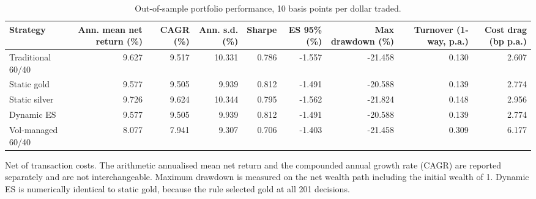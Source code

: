 \begin{table}[htbp]
\centering
\caption{Out-of-sample portfolio performance, 10 basis points per dollar traded.}
\label{tab:performance}
\begin{tabular}{lrrrrrrrr}
\toprule
Strategy & Ann. mean net return (\%) & CAGR (\%) & Ann. s.d. (\%) & Sharpe & ES 95\% (\%) & Max drawdown (\%) & Turnover (1-way, p.a.) & Cost drag (bp p.a.) \\
\midrule
Traditional 60/40 & 9.627 & 9.517 & 10.331 & 0.786 & -1.557 & -21.458 & 0.130 & 2.607 \\
Static gold & 9.577 & 9.505 & 9.939 & 0.812 & -1.491 & -20.588 & 0.139 & 2.774 \\
Static silver & 9.726 & 9.624 & 10.344 & 0.795 & -1.562 & -21.824 & 0.148 & 2.956 \\
Dynamic ES & 9.577 & 9.505 & 9.939 & 0.812 & -1.491 & -20.588 & 0.139 & 2.774 \\
Vol-managed 60/40 & 8.077 & 7.941 & 9.307 & 0.706 & -1.403 & -21.458 & 0.309 & 6.177 \\
\bottomrule
\end{tabular}
\begin{minipage}{\linewidth}\footnotesize Net of transaction costs. The arithmetic annualised mean net return and the compounded annual growth rate (CAGR) are reported separately and are not interchangeable. Maximum drawdown is measured on the net wealth path including the initial wealth of 1. Dynamic ES is numerically identical to static gold, because the rule selected gold at all 201 decisions.\end{minipage}
\end{table}
